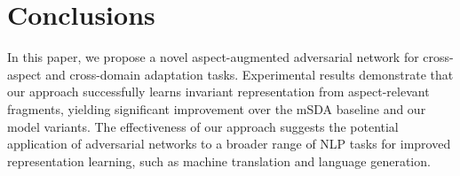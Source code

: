 \section{Conclusions}

In this paper, we propose a novel aspect-augmented adversarial network for cross-aspect and cross-domain adaptation tasks.
Experimental results demonstrate that our approach successfully learns invariant representation from aspect-relevant fragments, yielding significant improvement over the mSDA baseline and our model variants.
The effectiveness of our approach suggests the potential application of adversarial networks to a broader range of NLP tasks for improved representation learning, such as machine translation and language generation.
